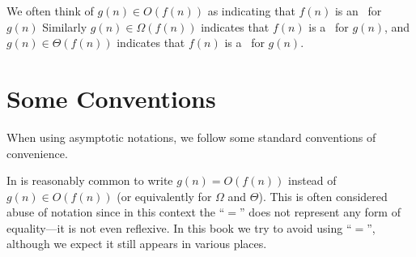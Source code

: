 \begin{gram}
  We often think of $g(n) \in O(f(n))$ as indicating that $f(n)$ is
  an~ for $g(n)$ Similarly $g(n) \in \Omega(f(n))$
  indicates that $f(n)$ is a~ for $g(n)$, and
  $g(n) \in \Theta(f(n))$ indicates that $f(n)$ is
  a~ for $g(n)$.
\end{gram}


\section{Some Conventions}
\label{sec:analysis::asymptotics::conventions}

\begin{gram}
When using asymptotic notations, we follow some standard conventions
of convenience.
%
\end{gram}

\begin{gram}[Writing $=$ Instead of $\in$]
  In is reasonably common to write $g(n) = O(f(n))$ instead of
  $g(n) \in O(f(n))$ (or equivalently for $\Omega$ and $\Theta$).
  This is often considered abuse of notation since in this context the ``$=$'' does not
  represent any form of equality---it is not even reflexive.   In this
  book we try to avoid using ``$=$'', although we expect it still appears in
  various places.
\end{gram}

